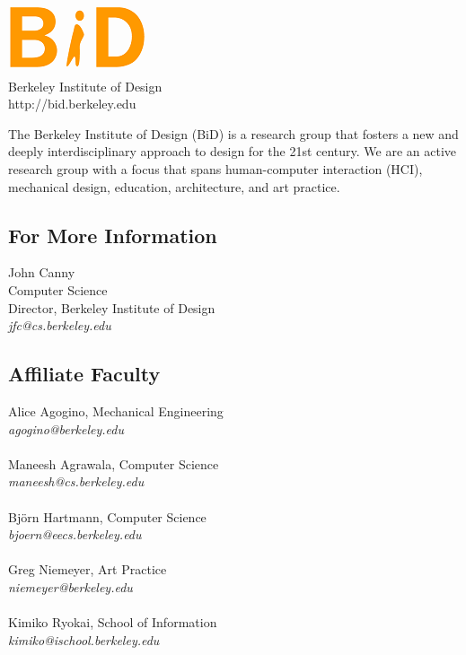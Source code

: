\documentclass[foldmark,10pt,a4paper,notumble]{leaflet}
\begin{document}
\begin{center}
\includegraphics{bid.png}\\
\Large{Berkeley Institute of Design}\\
\Large{http://bid.berkeley.edu}\\
\end{center}
The Berkeley Institute of Design (BiD) is a research group that fosters a new and deeply interdisciplinary approach to design for the 21st century.  We are an active research group with a focus that spans human-computer interaction (HCI), mechanical design, education, architecture, and art practice.\\

\subsection{For More Information}
John Canny\\
Computer Science\\
Director, Berkeley Institute of Design\\
\emph{jfc@cs.berkeley.edu}

\subsection{Affiliate Faculty}
Alice Agogino, Mechanical Engineering\\
\emph{agogino@berkeley.edu}\\
\\
Maneesh Agrawala, Computer Science\\
\emph{maneesh@cs.berkeley.edu}\\
\\
Bj\"orn Hartmann, Computer Science\\
\emph{bjoern@eecs.berkeley.edu}\\
\\
Greg Niemeyer, Art Practice\\
\emph{niemeyer@berkeley.edu}\\
\\
Kimiko Ryokai, School of Information\\
\emph{kimiko@ischool.berkeley.edu}\\
\newpage
\fontsize{3mm}{3.5mm}\selectfont
\end{document}
